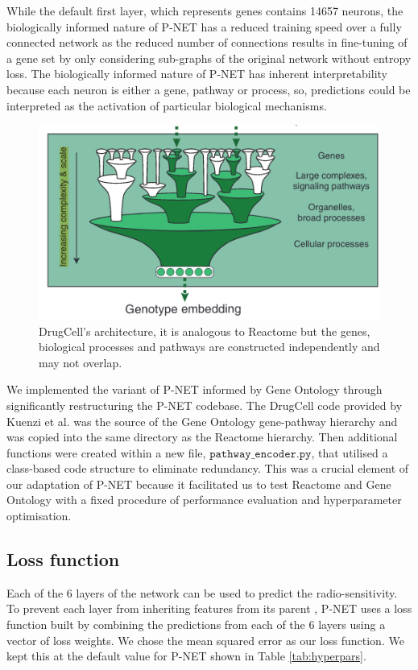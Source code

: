 \documentclass[NOTE, disdraft=true, UKenglish]{\DISCDTLATEXPATH UCLCDTDISdoc}
\begin{document}
While the default first layer, which represents genes contains 14657 neurons, the biologically informed nature of P-NET has a reduced training speed over a fully connected network as the reduced number of connections results in fine-tuning of a gene set by only considering sub-graphs of the original network without entropy loss. The biologically informed nature of P-NET has inherent interpretability because each neuron is either a gene, pathway or process, so, predictions could be interpreted as the activation of particular biological mechanisms.

\begin{figure}
    \centering
    \includegraphics[width=\linewidth]{Figures/drugcell_architecture.png}
    \caption{DrugCell's \cite{kuenzi_predicting_2020} architecture, it is analogous to Reactome but the genes, biological processes and pathways are constructed independently and may not overlap.}
    \label{fig:2}
\end{figure}

We implemented the variant of P-NET informed by Gene Ontology through significantly restructuring the P-NET codebase. The DrugCell code provided by Kuenzi et al. \cite{kuenzi_predicting_2020} was the source of the Gene Ontology gene-pathway hierarchy and was copied into the same directory as the Reactome hierarchy. Then additional functions were created within a new file, $\mathtt{pathway\_encoder.py}$, that utilised a class-based code structure to eliminate redundancy. This was a crucial element of our adaptation of P-NET because it facilitated us to test Reactome and Gene Ontology with a fixed procedure of performance evaluation and hyperparameter optimisation.

\subsection{Loss function}
Each of the 6 layers of the network can be used to predict the radio-sensitivity. To prevent each layer from inheriting features from its parent \cite{cosmin_thesis}, P-NET uses a loss function built by combining the predictions from each of the 6 layers using a vector of loss weights.  We chose the mean squared error as our loss function.
We kept this at the default value for P-NET shown in Table \ref{tab:hyperpars}.
\end{document}
